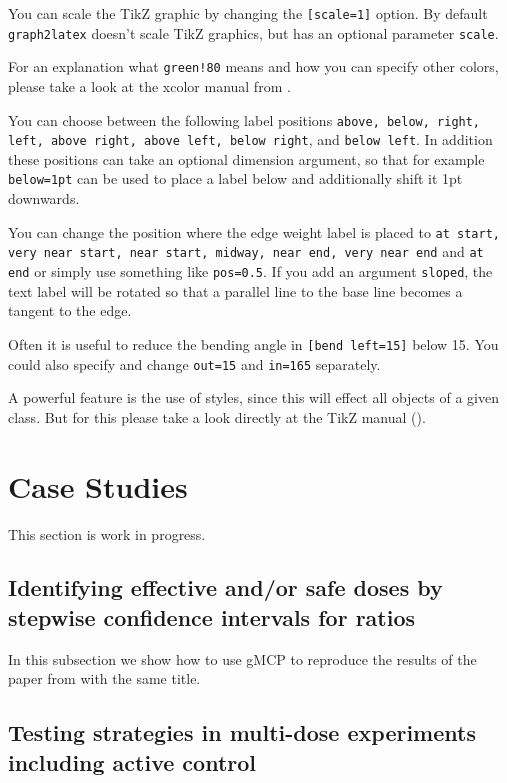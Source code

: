 \documentclass[a4paper, 10pt]{article}\usepackage[]{graphicx}\usepackage[]{color}
\numberwithin{equation}{section}
\theoremstyle{definition}
\theoremstyle{plain}
\begin{document}
You can scale the TikZ graphic by changing the \texttt{[scale=1]}
option.  By default \texttt{graph2latex} doesn't scale TikZ graphics,
but has an optional parameter \texttt{scale}.

For an explanation what \texttt{green!80} means and how you can
specify other colors, please take a look at the xcolor manual
from \cite{xcolor}.

You can choose between the following label positions \texttt{above,
  below, right, left, above right, above left, below right}, and
\texttt{below left}.  In addition these positions can take an optional
dimension argument, so that for example \texttt{below=1pt} can be used
to place a label below and additionally shift it 1pt downwards.

You can change the position where the edge weight label is placed to
\texttt{at start, very near start, near start, midway, near end, very
  near end} and \texttt{at end} or simply use something like
\texttt{pos=0.5}.  If you add an argument \texttt{sloped}, the text
label will be rotated so that a parallel line to the base line becomes
a tangent to the edge.

Often it is useful to reduce the bending angle in \texttt{[bend
    left=15]} below 15. You could also specify and change
\texttt{out=15} and \texttt{in=165} separately.

A powerful feature is the use of styles, since this will effect all
objects of a given class. But for this please take a look directly at
the TikZ manual (\cite{TikZ}).

\section{Case Studies}\label{sec:caseStudies}

This section is work in progress.

\subsection{Identifying effective and/or safe doses by stepwise confidence intervals for ratios}
In this subsection we show how to use gMCP to reproduce the results of the paper from \cite{bretz2003identifying} with the same title.

\subsection{Testing strategies in multi-dose experiments including active control}
\end{document}
